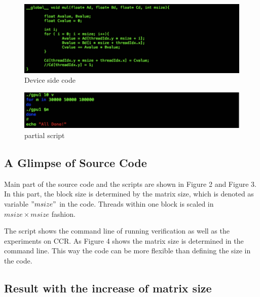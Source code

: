 \documentclass {article}
\begin{document}
\begin{figure}[htp!]
\centering
\includegraphics[width = \linewidth]{gpu12.pdf}
\caption{Device side code}
\label{fig:two}
\end{figure}

\begin{figure}[htp!]
\centering
\includegraphics[width = \linewidth]{gpu13.pdf}
\caption{partial script}
\label{fig:three}
\end{figure}

\subsection{A Glimpse of Source Code}

Main part of the source code and the scripts are shown in Figure 2 and Figure 3. In this part, the block size is determined by the matrix size, which is denoted as variable $"msize"$ in the code. Threads within one block is scaled in $msize \times msize$ fashion. 

The script shows the command line of running verification as well as the experiments on CCR. As Figure 4 shows the matrix size is determined in the command line. This way the code can be more flexible than defining the size in the code. 

\subsection{Result with the increase of matrix size}
\end{document}
